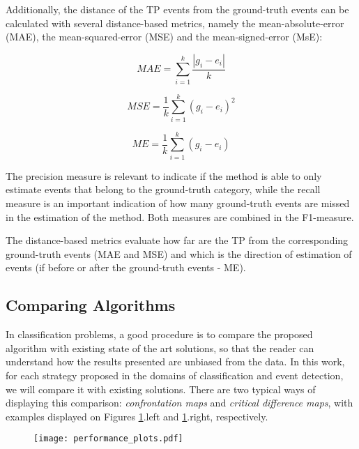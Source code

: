 Additionally, the distance of the TP events from the ground-truth events can be calculated with several distance-based metrics, namely the mean-absolute-error (MAE), the mean-squared-error (MSE) and the mean-signed-error (MsE):

\begin{equation}
    MAE = \sum^{k}_{i=1} \frac{|g_{i} - e_{i}|}{k}
\end{equation}

\begin{equation}
    MSE = \frac{1}{k} \sum^{k}_{i=1} (g_{i} - e_{i})^2
\end{equation}

\begin{equation}
    ME = \frac{1}{k} \sum^{k}_{i=1} (g_{i} - e_{i})
\end{equation}

The precision measure is relevant to indicate if the method is able to only estimate events that belong to the ground-truth category, while the recall measure is an important indication of how many ground-truth events are missed in the estimation of the method. Both measures are combined in the F1-measure.
\par
The distance-based metrics evaluate how far are the TP from the corresponding ground-truth events (MAE and MSE) and which is the direction of estimation of events (if before or after the ground-truth events - ME).

\subsection{Comparing Algorithms}

In classification problems, a good procedure is to compare the proposed algorithm with existing state of the art solutions, so that the reader can understand how the results presented are unbiased from the data. In this work, for each strategy proposed in the domains of classification and event detection, we will compare it with existing solutions. There are two typical ways of displaying this comparison: \textit{confrontation maps} and \textit{critical difference maps}, with examples displayed on Figures \ref{fig:performance_plots}.left and \ref{fig:performance_plots}.right, respectively.

\begin{figure}
\texttt{[image: performance\_plots.pdf]}
\label{fig:performance_plots}
\end{figure}

